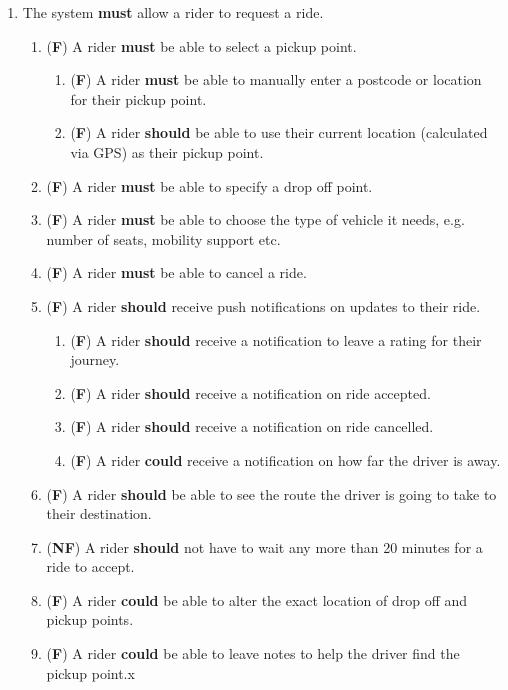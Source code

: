 \documentclass{article}
\begin{document}
    \begin{enumerate}
      \item The system \textbf{must} allow a rider to request a ride.
      \begin{enumerate}[label=1.\arabic{*}]
        \item (\textbf{F}) A rider \textbf{must} be able to select a pickup point.
        \begin{enumerate}[label=1.1.\arabic{*}]
          \item (\textbf{F}) A rider \textbf{must} be able to manually enter a postcode or location for their pickup point. 
          \item (\textbf{F}) A rider \textbf{should} be able to use their current location (calculated via GPS) as their pickup point.
        \end{enumerate}
        \item (\textbf{F}) A rider \textbf{must} be able to specify a drop off point.
        \item (\textbf{F}) A rider \textbf{must} be able to choose the type of vehicle it needs, e.g. number of seats, mobility support etc.
        \item (\textbf{F}) A rider \textbf{must} be able to cancel a ride.
        \item (\textbf{F}) A rider \textbf{should} receive push notifications on updates to their ride.
        \begin{enumerate}[label=1.5.\arabic{*}]
          \item (\textbf{F}) A rider \textbf{should} receive a notification to leave a rating for their journey.
          \item (\textbf{F}) A rider \textbf{should} receive a notification on ride accepted.
          \item (\textbf{F}) A rider \textbf{should} receive a notification on ride cancelled.
          \item (\textbf{F}) A rider \textbf{could} receive a notification on how far the driver is away.
        \end{enumerate}
        \item (\textbf{F}) A rider \textbf{should} be able to see the route the driver is going to take to their destination.
        \item (\textbf{NF}) A rider \textbf{should} not have to wait any more than 20 minutes for a ride to accept.
        \item (\textbf{F}) A rider \textbf{could} be able to alter the exact location of drop off and pickup points.
        \item (\textbf{F}) A rider \textbf{could} be able to leave notes to help the driver find the pickup point.x
      \end{enumerate}


\end{enumerate}
\end{document}
